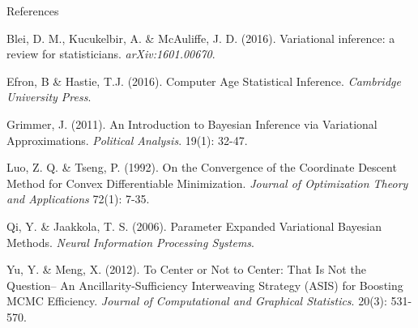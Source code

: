 \documentclass[final]{beamer}
\newlength{\onecolwid}
\begin{document}
\begin{frame}[t]
\begin{columns}[t]
\begin{column}{\onecolwid}

\begin{block}{References}


\scriptsize{ %

\noindent[1] Blei, D. M., Kucukelbir, A. \& McAuliffe, J. D. (2016). Variational inference: a review for statisticians. {\itshape arXiv:1601.00670}.

\noindent[2] Efron, B \& Hastie, T.J. (2016). Computer Age Statistical Inference. {\itshape Cambridge University Press}.

\noindent[3] Grimmer, J. (2011). An Introduction to Bayesian Inference via Variational Approximations. {\itshape Political Analysis}. 19(1): 32-47.

\noindent[4] Luo, Z. Q. \& Tseng, P. (1992). On the Convergence of the Coordinate Descent Method for Convex Differentiable Minimization. {\itshape Journal of Optimization Theory and Applications} 72(1): 7-35. 

\noindent[5] Qi, Y. \& Jaakkola, T. S. (2006). Parameter Expanded Variational Bayesian Methods. {\itshape Neural Information Processing Systems}. 

\noindent[6] Yu, Y. \& Meng, X. (2012). To Center or Not to Center: That Is Not the
Question-- An Ancillarity-Sufficiency Interweaving Strategy (ASIS) for Boosting MCMC Efficiency. {\itshape Journal of Computational and Graphical Statistics}. 20(3): 531-570. 

}

\end{block}








\end{column} %

\end{columns} %

\end{frame} %
\end{document}
